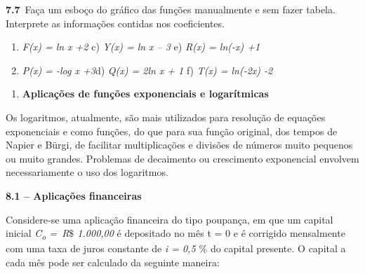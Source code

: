 \documentclass[12pt]{article}
\begin{document}
\begin{adjustwidth}{0.3in}{0.0in}
\textbf{7.7}\  Faça um esboço do gráfico das funções manualmente e sem fazer tabela. Interprete as informações contidas nos coeficientes.\par

\end{adjustwidth}

\begin{enumerate}
	\item \textit{F(x) = ln x +2} \tab \tab c) \textit{Y(x) = ln x – 3 \tab }e)\textit{ R(x) = ln(-x) +1}\par

	\item \textit{P(x) = -log x +3\tab }\tab d) \textit{Q(x) = 2ln x + 1 \tab }f)\textit{ T(x) = ln(-2x) -2} 
\end{enumerate}\par


\vspace{\baselineskip}

\vspace{\baselineskip}
\begin{enumerate}
	\item {\fontsize{14pt}{16.8pt}\selectfont \textbf{Aplicações de funções exponenciais e logarítmicas}\par}
\end{enumerate}\par


\vspace{\baselineskip}
Os logaritmos, atualmente, são mais utilizados para resolução de equações exponenciais e como funções, do que para sua função original, dos tempos de Napier e Bürgi, de facilitar multiplicações e divisões de números muito pequenos ou muito grandes. Problemas de decaimento ou crescimento exponencial envolvem necessariamente o uso dos logaritmos.\par


\vspace{\baselineskip}
{\fontsize{14pt}{16.8pt}\selectfont \textbf{8.1 – Aplicações financeiras }\par}\par


\vspace{\baselineskip}
Considere-se uma aplicação financeira do tipo poupança, em que um capital inicial \textit{C\textsubscript{o }=\  R$\$$  1.000,00} é depositado no mês t = 0 e é corrigido mensalmente com uma taxa de juros constante de \textit{i = 0,5 $\%$ } do capital presente. O capital a cada mês pode ser calculado da seguinte maneira:\par
\end{document}
